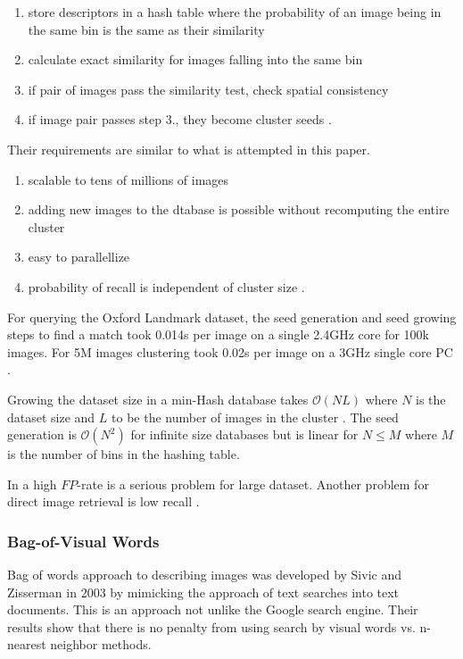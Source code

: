 \documentclass[english,12pt,a4paper,pdftex,elec,utf8]{aaltothesis}
\begin{document}
\begin{enumerate}
\item store descriptors in a hash table where the probability of an image being in the same bin is the same as their similarity
\item calculate exact similarity for images falling into the same bin
\item if pair of images pass the similarity test, check spatial consistency
\item if image pair passes step 3., they become cluster seeds \cite{Chum2010}.
\end{enumerate}

Their requirements are similar to what is attempted in this paper.

\begin{enumerate}
\item scalable to tens of millions of images
\item adding new images to the dtabase is possible without recomputing the entire cluster
\item easy to parallellize
\item probability of recall is independent of cluster size \cite{Chum2010}.
\end{enumerate}

For querying the Oxford Landmark dataset, the seed generation and seed growing steps to find a match took 0.014s per image on a single 2.4GHz core for 100k images. For 5M images clustering took 0.02s per image on a 3GHz single core PC \cite{Chum2010}.

Growing the dataset size in a min-Hash database takes $\mathcal{O}(NL)$ where $N$ is the dataset size and $L$ to be the number of images in the cluster \cite{Chum2010}. The seed generation is $\mathcal{O}(N^2)$ for infinite size databases but is linear for $N \leq M$ where $M$ is the number of bins in the hashing table.

In \cite{Lee2010} a high $FP$-rate is a serious problem for large dataset. Another problem for direct image retrieval is low recall \cite{Chum2010}.

\subsubsection{Bag-of-Visual Words}\label{BOW}
Bag of words approach to describing images was developed by Sivic and Zisserman in 2003 by mimicking the approach of text searches into text documents. This is an approach not unlike the Google search engine. Their results show that there is no penalty from using search by visual words vs. n-nearest neighbor methods.\cite{Sivic2003}
\end{document}
